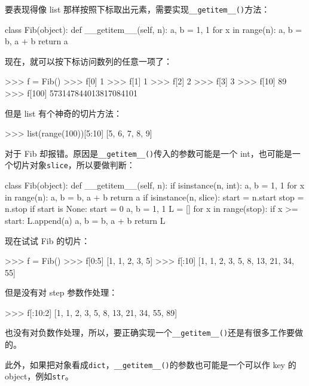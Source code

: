 要表现得像 list
那样按照下标取出元素，需要实现\texttt{\_\_getitem\_\_()}方法：

\begin{pythoncode}
class Fib(object):
    def __getitem__(self, n):
        a, b = 1, 1
        for x in range(n):
            a, b = b, a + b
        return a
\end{pythoncode}

现在，就可以按下标访问数列的任意一项了：

\begin{pythoncode}
>>> f = Fib()
>>> f[0]
1
>>> f[1]
1
>>> f[2]
2
>>> f[3]
3
>>> f[10]
89
>>> f[100]
573147844013817084101
\end{pythoncode}

但是 list 有个神奇的切片方法：

\begin{pythoncode}
>>> list(range(100))[5:10]
[5, 6, 7, 8, 9]
\end{pythoncode}

对于 Fib 却报错。原因是\texttt{\_\_getitem\_\_()}传入的参数可能是一个
int，也可能是一个切片对象\texttt{slice}，所以要做判断：

\begin{pythoncode}
class Fib(object):
    def __getitem__(self, n):
        if isinstance(n, int): 
            a, b = 1, 1
            for x in range(n):
                a, b = b, a + b
            return a
        if isinstance(n, slice): 
            start = n.start
            stop = n.stop
            if start is None:
                start = 0
            a, b = 1, 1
            L = []
            for x in range(stop):
                if x >= start:
                    L.append(a)
                a, b = b, a + b
            return L
\end{pythoncode}

现在试试 Fib 的切片：

\begin{pythoncode}
>>> f = Fib()
>>> f[0:5]
[1, 1, 2, 3, 5]
>>> f[:10]
[1, 1, 2, 3, 5, 8, 13, 21, 34, 55]
\end{pythoncode}

但是没有对 step 参数作处理：

\begin{pythoncode}
>>> f[:10:2]
[1, 1, 2, 3, 5, 8, 13, 21, 34, 55, 89]
\end{pythoncode}

也没有对负数作处理，所以，要正确实现一个\texttt{\_\_getitem\_\_()}还是有很多工作要做的。

此外，如果把对象看成\texttt{dict}，\texttt{\_\_getitem\_\_()}的参数也可能是一个可以作
key 的 object，例如\texttt{str}。

